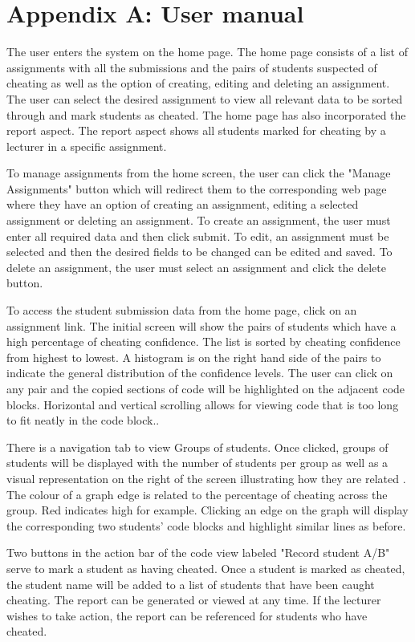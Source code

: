 \documentclass[11pt,a4paper]{article}
\begin{document}
\section{Appendix A: User manual}

The user enters the system on the home page. The home page consists of a list of
assignments with all the submissions and the pairs of students suspected of
cheating as well as the option of creating, editing and deleting an assignment.
The user can select the desired assignment to view all relevant data to be
sorted through and mark students as cheated. The home page has also incorporated
the report aspect. The report aspect shows all students marked for cheating by a
lecturer in a specific assignment. 

To manage assignments from the home screen, the user can click the "Manage
Assignments" button which will redirect them to the corresponding web page where
they have an option of creating an assignment, editing a selected assignment or
deleting an assignment. To create an assignment, the user must enter all
required data and then click submit. To edit, an assignment must be selected and
then the desired fields to be changed can be edited and saved. To delete an
assignment, the user must select an assignment and click the delete button.

To access the student submission data from the home page, click on an assignment
link. The initial screen will show the pairs of students which have a high
percentage of cheating confidence. The list is sorted by cheating confidence
from highest to lowest. A histogram is on the right hand side of the pairs to
indicate the general distribution of the confidence levels. The user can click
on any pair and the copied sections of code will be highlighted on the adjacent
code blocks. Horizontal and vertical scrolling allows for viewing code that is
too long to fit neatly in the code block..

There is a navigation tab to view Groups of students. Once clicked, groups of
students will be displayed with the number of students per group as well as a
visual representation on the right of the screen illustrating how they are
related . The colour of a graph edge is related to the percentage of cheating
across the group. Red indicates high for example. Clicking an edge on the graph
will display the corresponding two students' code blocks and highlight similar
lines as before. 

Two buttons in the action bar of the code view labeled "Record student A/B"
serve to mark a student as having cheated. Once a student is marked as cheated,
the student name will be added to a list of students that have been caught
cheating. The report can be generated or viewed at any time. If the lecturer
wishes to take action, the report can be referenced for students who have cheated.  
\end{document}
